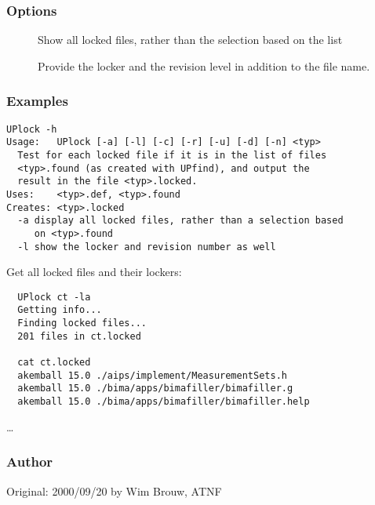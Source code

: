 \subsubsection*{Options}

\begin{description}
\item[]
    Show all locked files, rather than the selection based on the
     list
\item[]
    Provide the locker and the revision level in addition to the file name.
\end{description}

\subsubsection*{Examples}

\begin{verbatim}
UPlock -h
Usage:   UPlock [-a] [-l] [-c] [-r] [-u] [-d] [-n] <typ>
  Test for each locked file if it is in the list of files
  <typ>.found (as created with UPfind), and output the 
  result in the file <typ>.locked.
Uses:    <typ>.def, <typ>.found
Creates: <typ>.locked
  -a display all locked files, rather than a selection based
     on <typ>.found
  -l show the locker and revision number as well
\end{verbatim}

\noindent
Get all locked files and their lockers:

\begin{verbatim}
  UPlock ct -la
  Getting info...
  Finding locked files...
  201 files in ct.locked

  cat ct.locked
  akemball 15.0 ./aips/implement/MeasurementSets.h
  akemball 15.0 ./bima/apps/bimafiller/bimafiller.g
  akemball 15.0 ./bima/apps/bimafiller/bimafiller.help
\end{verbatim}
\ldots

\subsubsection*{Author}

Original: 2000/09/20 by Wim Brouw, ATNF


\newpage

\subsection{}
\label{UPcasa}

